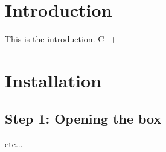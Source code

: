 \hypertarget{index_intro_sec}{}\section{Introduction}\label{index_intro_sec}
This is the introduction. {\ttfamily C++}\hypertarget{index_install_sec}{}\section{Installation}\label{index_install_sec}
\hypertarget{index_step1}{}\subsection{Step 1\+: Opening the box}\label{index_step1}
etc... 
